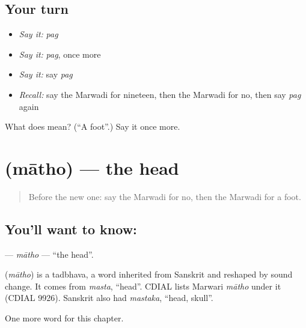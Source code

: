 \subsection*{Your turn}
\begin{itemize}
\raggedright
  \item \emph{Say it:} \emph{pag}
  \item \emph{Say it:} \emph{pag}, once more
  \item \emph{Say it:} say \emph{pag}
  \item \emph{Recall:} say the Marwadi for nineteen, then the Marwadi for no, then say \emph{pag} again
\end{itemize}

\begin{tcolorbox}[breakable,colback=teal!4,colframe=teal!35!black,title={Before you move on}]
What does  mean? (\textquotedblleft{}A foot\textquotedblright{}.) Say it once more.
\end{tcolorbox}
\section[\texorpdfstring{\mw{माथो} (mātho)}{माथो (mātho)}]{ (mātho) — the head}

\label{lesson:MW-C44-matho}



\begin{quote}
Before the new one: say the Marwadi for no, then the Marwadi for a foot.
\end{quote}

\subsection*{You'll want to know: }
\textbf{} — \emph{mātho} — \textquotedblleft{}the head\textquotedblright{}.

\begin{cousinweb}
\textbf{} (\emph{mātho}) is a tadbhava, a word inherited from Sanskrit and reshaped by sound change. It comes from \emph{masta}, \textquotedblleft{}head\textquotedblright{}. CDIAL lists Marwari \emph{mātho} under it (CDIAL 9926). Sanskrit also had \emph{mastaka}, \textquotedblleft{}head, skull\textquotedblright{}.
\end{cousinweb}

\begin{grammarlens}[title={What you've built}]
One more word for this chapter.
\end{grammarlens}

